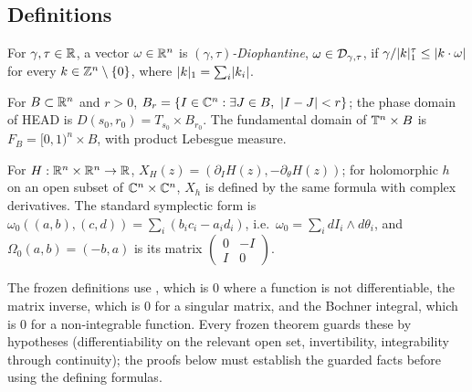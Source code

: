 \subsection{Definitions}\label{bp:p0:defs}

\begin{definition}\label{bp:p0:diophantine}
For $\gamma,\tau\in\mathbb{R}$, a vector $\omega\in\mathbb{R}^n$ is \emph{$(\gamma,\tau)$-Diophantine},
$\omega\in\mathcal{D}_{\gamma,\tau}$, if $\gamma/\lvert k\rvert_1^{\tau}\le\lvert k\cdot\omega\rvert$ for every
$k\in\mathbb{Z}^n\setminus\{0\}$, where $\lvert k\rvert_1=\sum_i\lvert k_i\rvert$.
\end{definition}

\begin{definition}\label{bp:p0:domains}
For $B\subset\mathbb{R}^n$ and $r>0$, $B_r=\{I\in\C^n:\exists J\in B,\ \abs{I-J}<r\}$; the phase domain
of HEAD is $D(s_0,r_0)=T_{s_0}\times B_{r_0}$. The fundamental domain of $\mathbb{T}^n\times B$ is
$F_B=[0,1)^n\times B$, with product Lebesgue measure.
\end{definition}

\begin{definition}\label{bp:p0:hamiltonian}
For $H:\mathbb{R}^n\times\mathbb{R}^n\to\mathbb{R}$, $X_H(z)=(\partial_I H(z),-\partial_\theta H(z))$; for holomorphic
$h$ on an open subset of $\mathbb{C}^n\times\mathbb{C}^n$, $X_h$ is defined by the same formula with complex
derivatives. The standard symplectic form is
$\omega_0((a,b),(c,d))=\sum_i(b_ic_i-a_id_i)$, i.e.\ $\omega_0=\sum_i dI_i\wedge d\theta_i$, and
$\Omega_0(a,b)=(-b,a)$ is its matrix $\left(\begin{smallmatrix}0&-I\\ I&0\end{smallmatrix}\right)$.
\end{definition}

\begin{remark}\label{bp:p0:totality}
The frozen definitions use , which is $0$ where a function is not differentiable,
the matrix inverse, which is $0$ for a singular matrix, and the Bochner integral, which is $0$ for
a non-integrable function. Every frozen theorem guards these by hypotheses (differentiability on
the relevant open set, invertibility, integrability through continuity); the proofs below must
establish the guarded facts before using the defining formulas.
\end{remark}

